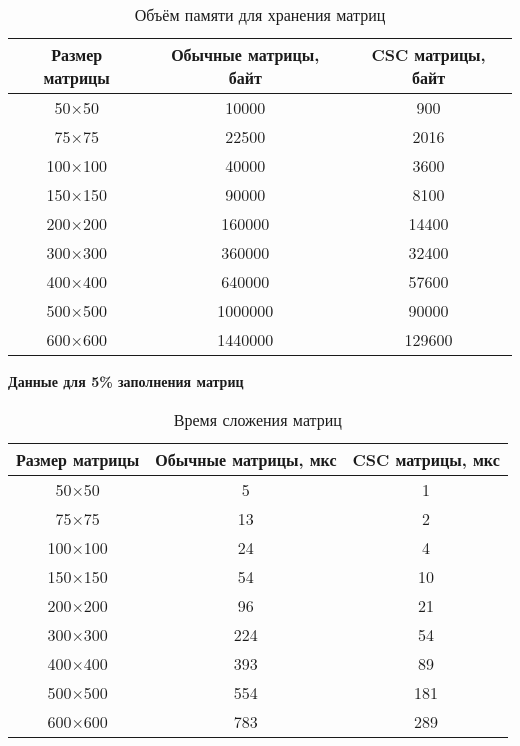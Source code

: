 \begin{table}[H]
	\centering
	\caption{Объём памяти для хранения матриц}
	\begin{tabular}{|c|c|c|}
		\hline
		Размер матрицы & Обычные матрицы, байт & CSC матрицы, байт \\ \hline
		50$\times$50         & 10000                 & 900              \\ \hline
		75$\times$75         & 22500                 & 2016             \\ \hline
		100$\times$100        & 40000                 & 3600             \\ \hline
		150$\times$150        & 90000                 & 8100             \\ \hline
		200$\times$200        & 160000                & 14400            \\ \hline
		300$\times$300        & 360000                & 32400            \\ \hline
		400$\times$400        & 640000                & 57600            \\ \hline
		500$\times$500        & 1000000               & 90000            \\ \hline
		600$\times$600        & 1440000               & 129600           \\ \hline
	\end{tabular}
\end{table}


\newpage
\textbf{Данные для 5\% заполнения матриц}
\begin{table}[H]
	\centering
	\caption{Время сложения матриц}
	\begin{tabular}{|c|c|c|}
		\hline
		Размер матрицы & Обычные матрицы, мкс & CSC матрицы, мкс \\ \hline
		50$\times$50         & 5                    & 1                \\ \hline
		75$\times$75         & 13                   & 2                \\ \hline
		100$\times$100        & 24                   & 4                \\ \hline
		150$\times$150        & 54                   & 10               \\ \hline
		200$\times$200        & 96                   & 21               \\ \hline
		300$\times$300        & 224                  & 54               \\ \hline
		400$\times$400        & 393                  & 89               \\ \hline
		500$\times$500        & 554                  & 181              \\ \hline
		600$\times$600        & 783                  & 289              \\ \hline
	\end{tabular}
\end{table}

